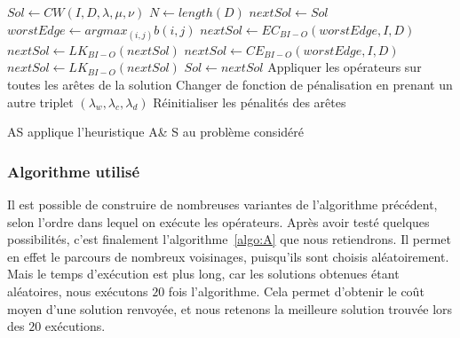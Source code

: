\documentclass[a4paper,11pt]{article}%
\begin{document}
\begin{algorithm}
\DontPrintSemicolon %
$Sol \gets CW(I,D,\lambda,\mu,\nu)$\;
$N \gets length(D)$\;
$nextSol \gets Sol$\;
 {
	$worstEdge \gets argmax_{(i,j)} b(i,j) $\;
	$nextSol \gets EC_{BI-O}(worstEdge,I,D)$\;
	$nextSol \gets LK_{BI-O}(nextSol)$\;
	$nextSol \gets CE_{BI-O}(worstEdge,I,D)$\;
	$nextSol \gets LK_{BI-O}(nextSol)$\;
	 {
		$ Sol \gets nextSol$\;
	}
	 {
		Appliquer les opérateurs sur toutes les arêtes de la solution\;
	}
	 {
		Changer de fonction de pénalisation en prenant un autre triplet $(\lambda_w,\lambda_c,\lambda_d)$\;
	}
	 {
		Réinitialiser les pénalités des arêtes\;
	}
}
\;
\caption{{\sc AS} applique l'heuristique A\& S au problème considéré}
\label{algo:AS}
\end{algorithm}



\subsubsection{Algorithme utilisé}

Il est possible de construire de nombreuses variantes de l'algorithme précédent, selon l'ordre dans lequel on exécute les opérateurs. 
Après avoir testé quelques possibilités, c'est finalement l'algorithme~\ref{algo:A} que nous retiendrons. 
Il permet en effet le parcours de nombreux voisinages, puisqu'ils sont choisis aléatoirement. 
Mais le temps d'exécution est plus long, car les solutions obtenues étant aléatoires, nous exécutons $20$ fois l'algorithme. 
Cela permet d'obtenir le coût moyen d'une solution renvoyée, et nous retenons la meilleure solution trouvée lors des $20$ exécutions. 
\end{document}
